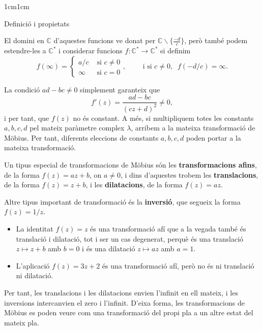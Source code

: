 \begin{adjustwidth}{1cm}{1cm}
\begin{subsection}{Definició i propietats}
\begin{definicio}
        El domini en $\mathbb{C}$ d'aquestes funcions ve donat per $\mathbb{C}\backslash\{\frac{-d}{c}\}$, però també podem estendre-les a $\mathbb{C}^*$ i considerar funcions $f:\mathbb{C}^*\to \mathbb{C}^*$ si definim 
        \[
            f(\infty)=
            \begin{cases}
                a/c & \text{ si } c\neq 0 \\
                \infty & \text{ si } c=0
            \end{cases}, \qquad \text{ i si } c\neq 0, \; \; f(-d/c)=\infty.
        \]
        
        
        La condició $ad-bc\neq 0$ simplement garanteix que $$f'(z) = \frac{ad - bc}{(cz + d)^2} \neq 0,$$ i per tant, que $f(z)$ no és constant. A més, si multipliquem totes les constants $a, b, c, d$ pel mateix paràmetre complex $\lambda$, arribem a la mateixa transformació de Möbius. Per tant, diferents eleccions de constants $a, b, c, d$ poden portar a la mateixa transformació.  
    \end{definicio}

        Un tipus especial de transformacions de Möbius són les \textbf{transformacions afins}, de la forma $f(z)=az+b$, on $a \neq 0$, i dins d'aquestes trobem les \textbf{translacions}, de la forma $f(z)=z+b$, i les \textbf{dilatacions}, de la forma $f(z)=az$.

        Altre tipus important de transformació és la \textbf{inversió}, que segueix la forma $f(z)=1/z$.

        \bigskip

    \begin{exemples}
        \leavevmode
        \begin{itemize}
            \item La identitat $f(z)=z$ és una transformació afí que a la vegada també és translació i dilatació, tot i ser un cas degenerat, perquè és una translació $z\mapsto z+b$ amb $b=0$ i és una dilatació $z\mapsto az$ amb $a=1$. 
            \item L'aplicació $f(z)=3z+2$ és una transformació afí, però no és ni translació ni dilatació.
        \end{itemize}  
    \end{exemples}


    Per tant, les translacions i les dilatacions envien l'infinit en ell mateix, i les inversions intercanvien el zero i l'infinit. D'eixa forma, les transformacions de Möbius es poden veure com una transformació del propi pla a un altre estat del mateix pla.


\end{subsection}
\end{adjustwidth}
